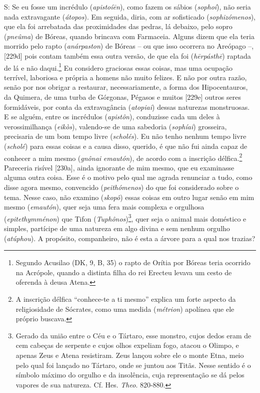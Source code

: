 S: Se eu fosse um incrédulo (\emph{apistoíēn}), como fazem os sábios
(\emph{sophoí}), não seria nada extravagante (\emph{átopos}). Em
seguida, diria, com ar sofisticado (\emph{sophizómenos}), que ela foi
arrebatada das proximidades das pedras, lá debaixo, pelo sopro
(\emph{pneûma}) de Bóreas, quando brincava com Farmaceia. Alguns dizem
que ela teria morrido pelo rapto (\emph{anárpaston}) de Bóreas -- ou que
isso ocorrera no Areópago --, {[}229d{]} pois contam também essa outra
versão, de que ela foi (\emph{hērpásthē}) raptada de lá e não
daqui.\footnote{Segundo Acusilao (DK, 9, B, 35) o rapto de Orítia por
  Bóreas teria ocorrido na Acrópole, quando a distinta filha do rei
  Erecteu levava um cesto de oferenda à deusa Atena.} Eu considero
graciosas essas coisas, mas uma ocupação terrível, laboriosa e própria a
homens não muito felizes. E não por outra razão, senão por nos obrigar a
restaurar, necessariamente, a forma dos Hipocentauros, da Quimera, de
uma turba de Górgonas, Pégasos e muitos {[}229e{]} outros seres
formidáveis, por conta da extravagância (\emph{atopiai}) dessas
naturezas monstruosas. E se alguém, entre os incrédulos
(\emph{apistôn}), conduzisse cada um deles à verossimilhança
(\emph{eikòs}), valendo-se de uma sabedoria (\emph{sophíai}) grosseira,
precisaria de um bom tempo livre (\emph{scholés}). Eu não tenho nenhum
tempo livre (\emph{scholé}) para essas coisas e a causa disso, querido,
é que não fui ainda capaz de conhecer a mim mesmo (\emph{gnônai}
\emph{emautón}), de acordo com a inscrição délfica.\footnote{A inscrição
  délfica ``conhece-te a ti mesmo'' explica um forte aspecto da
  religiosidade de Sócrates, como uma medida (\emph{métrion}) apolínea
  que ele próprio buscava.} Pareceria risível {[}230a{]}, ainda
ignorante de mim mesmo, que eu examinasse alguma outra coisa. Esse é o
motivo pelo qual me agrada renunciar a tudo, como disse agora mesmo,
convencido (\emph{peithómenos}) do que foi considerado sobre o tema.
Nesse caso, não examino (\emph{skopô}) essas coisas em outro lugar senão
em mim mesmo (\emph{emautón}), quer seja uma fera mais complexa e
orgulhosa (\emph{epitethymménon}) que Tifon (\emph{Tuphônos})\footnote{Gerado
  da união entre o Céu e o Tártaro, esse monstro, cujos dedos eram de
  cem cabeças de serpente e cujos olhos expeliam fogo, atacou o Olimpo,
  e apenas Zeus e Atena resistiram. Zeus lançou sobre ele o monte Etna,
  meio pelo qual foi lançado no Tártaro, onde se juntou aos Titãs. Nesse
  sentido é o símbolo máximo do orgulho e da insolência, cuja
  representação se dá pelos vapores de sua natureza. Cf. Hes.
  \emph{Theo}. 820-880.}, quer seja o animal mais doméstico e simples,
partícipe de uma natureza em algo divina e sem nenhum orgulho
(\emph{atúphou}). A propósito, companheiro, não é esta a árvore para a
qual nos trazias?

